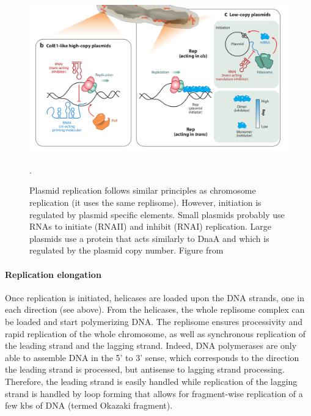 \begin{figure}[!ht]
	\centering
	\includegraphics[width=0.8\linewidth]{figure/plasmidReplicationInitiation}
	\caption{Plasmid replication follows similar principles as chromosome replication (it uses the same replisome). However, initiation is regulated by plasmid specific elements. Small plasmids probably use RNAs to initiate (RNAII) and inhibit (RNAI) replication. Large plasmids use a protein that acts similarly to DnaA and which is regulated by the plasmid copy number. Figure from \citet{reyes-lamothe_chromosome_2012}}.
	\label{fig:plasmidInitiation}
\end{figure}

\paragraph{Replication elongation} Once replication is initiated, helicases are loaded upon the DNA strands, one in each direction (see above). From the helicases, the whole replisome complex can be loaded and start polymerizing DNA. The replisome ensures processivity and rapid replication of the whole chromosome, as well as synchronous replication of the leading strand and the lagging strand. Indeed, DNA polymerases are only able to assemble DNA in the 5' to 3' sense, which corresponds to the direction the leading strand is processed, but antisense to lagging strand processing. Therefore, the leading strand is easily handled while replication of the lagging strand is handled by loop forming that allows for fragment-wise replication of a few kbs of DNA (termed Okazaki fragment).

